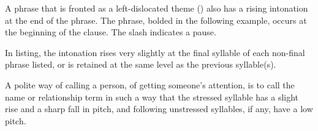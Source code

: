 A phrase that is fronted as a left-dislocated theme () also has a rising intonation at the end of the phrase.  The phrase, bolded in the following example, occurs at the beginning of the clause.  The slash indicates a pause.

 

  
In listing, the intonation rises very slightly at the final syllable of each non-final phrase listed, or is retained at the same level as the previous syllable(s).


 

A polite way of calling a person, of getting someone's attention, is to call the name or relationship term in such a way that the stressed syllable has a slight rise and a sharp fall in pitch, and following unstressed syllables, if any, have a low pitch.



